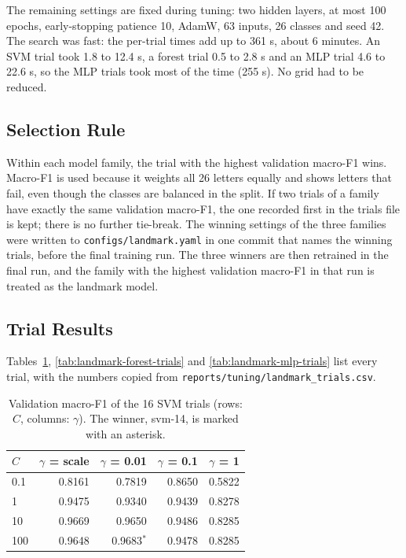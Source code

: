 The remaining settings are fixed during tuning: two hidden layers, at most 100 epochs, early-stopping patience 10, AdamW, 63 inputs, 26 classes and seed 42. The search was fast: the per-trial times add up to 361 s, about 6 minutes. An SVM trial took 1.8 to 12.4 s, a forest trial 0.5 to 2.8 s and an MLP trial 4.6 to 22.6 s, so the MLP trials took most of the time (255 s). No grid had to be reduced.

\subsection{Selection Rule}

Within each model family, the trial with the highest validation macro-F1 wins. Macro-F1 is used because it weights all 26 letters equally and shows letters that fail, even though the classes are balanced in the split. If two trials of a family have exactly the same validation macro-F1, the one recorded first in the trials file is kept; there is no further tie-break. The winning settings of the three families were written to \texttt{configs/landmark.yaml} in one commit that names the winning trials, before the final training run. The three winners are then retrained in the final run, and the family with the highest validation macro-F1 in that run is treated as the landmark model.

\subsection{Trial Results}

Tables~\ref{tab:landmark-svm-trials}, \ref{tab:landmark-forest-trials} and \ref{tab:landmark-mlp-trials} list every trial, with the numbers copied from \texttt{reports/tuning/\allowbreak landmark\_trials.csv}.

\begin{table}[htbp]
\centering
\caption{Validation macro-F1 of the 16 SVM trials (rows: $C$, columns: $\gamma$). The winner, svm-14, is marked with an asterisk.}
\label{tab:landmark-svm-trials}
\begin{tabular}{lrrrr}
\toprule
$C$ & $\gamma$ = scale & $\gamma$ = 0.01 & $\gamma$ = 0.1 & $\gamma$ = 1 \\
\midrule
0.1 & 0.8161 & 0.7819 & 0.8650 & 0.5822 \\
1 & 0.9475 & 0.9340 & 0.9439 & 0.8278 \\
10 & 0.9669 & 0.9650 & 0.9486 & 0.8285 \\
100 & 0.9648 & 0.9683$^{*}$ & 0.9478 & 0.8285 \\
\bottomrule
\end{tabular}
\end{table}


